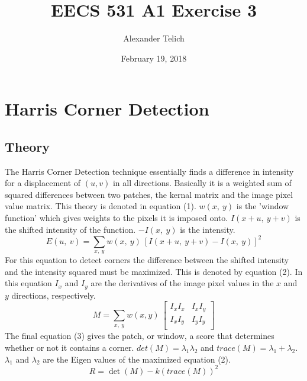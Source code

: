 \documentclass[11pt]{article}
\author{Alexander Telich}
\title{EECS 531 A1 Exercise 3}
\date{February 19, 2018}
\begin{document}
    \maketitle
    \section{Harris Corner Detection}\label{sec:exercise3}
    \subsection{Theory}\label{subsec:1.NoiseReduction}
    \setlength\parindent{24pt}
    The Harris Corner Detection technique essentially finds a difference in intensity for a displacement
    of $(u, v)$ in all directions.
    Basically it is a weighted sum of squared differences between two patches, the
    kernal matrix and the image pixel value matrix.
    This theory is denoted in equation (1).
    $w\left(x,\ y\right)$ is the 'window function' which gives weights to the pixels it is
    imposed onto. $I\left(x+u,\ y+v\right)$ is the shifted intensity of the function.
    $-I\left(x,\ y\right)$ is the intensity.
    \begin{equation}
        E\left(u,\ v\right)=\sum_{x,\ y}{w\left(x,\ y\right)\ \left[I\left(x+u,\ y+v\right)-I\left(x,\ y\right)\right]^2}
    \end{equation}
    \newline
    For this equation to detect corners the difference between the shifted intensity and the intensity squared
    must be maximized.
    This is denoted by equation (2).
    In this equation $I_x$ and $I_y$ are the derivatives of the image pixel values in the
    $x$ and $y$ directions, respectively.
    \begin{equation}
        M=\sum_{x,\ y}{w\left(x,y\right)\ \left[\begin{matrix}I_xI_x&I_xI_y\\I_xI_y&I_yI_y\\\end{matrix}\right]}
    \end{equation}
    \newline
    The final equation (3) gives the patch, or window, a score that determines whether or not it contains a corner.
    $det(M) = \lambda_1 \lambda_2$ and $trace(M) = {\lambda_1+\lambda_2}$. $\lambda_1$ and $\lambda_2$ are
    the Eigen values of the maximized equation (2).
    \begin{equation}
        R=\det{\left(M\right)}-k\left(trace\left(M\right)\right)^2
    \end{equation}
\end{document}
